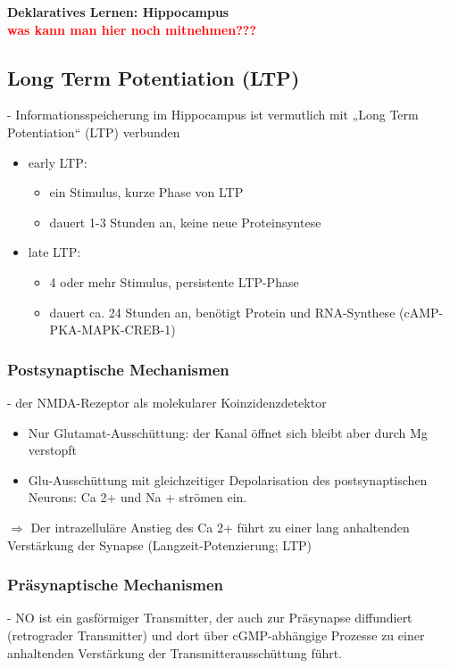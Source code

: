 \textbf{Deklaratives Lernen: Hippocampus}\\
\textcolor{red}{\textbf{was kann man hier noch mitnehmen???}}

\subsection{Long Term Potentiation (LTP)}
 - Informationsspeicherung im Hippocampus ist vermutlich mit „Long Term Potentiation“ (LTP) verbunden

\begin{itemize}
	\item early LTP:
	\begin{itemize}
		\item ein Stimulus, kurze Phase von LTP
		\item dauert 1-3 Stunden an, keine neue Proteinsyntese
	\end{itemize}
	\item late LTP:
	\begin{itemize}
		\item 4 oder mehr Stimulus, persistente LTP-Phase
		\item dauert ca. 24 Stunden an, benötigt Protein und RNA-Synthese (cAMP-PKA-MAPK-CREB-1)
	\end{itemize}
\end{itemize}

\subsubsection{Postsynaptische Mechanismen}
 - der NMDA-Rezeptor als molekularer Koinzidenzdetektor
\begin{itemize}
	\item Nur Glutamat-Ausschüttung: der Kanal öffnet sich bleibt aber durch Mg verstopft
	\item Glu-Ausschüttung mit gleichzeitiger Depolarisation des postsynaptischen Neurons: Ca 2+ und Na + strömen ein.
\end{itemize}

$\Rightarrow$ Der intrazelluläre Anstieg des Ca 2+ führt zu einer lang anhaltenden Verstärkung der Synapse (Langzeit-Potenzierung; LTP)

\subsubsection{Präsynaptische Mechanismen}
 - NO ist ein gasförmiger Transmitter, der auch zur Präsynapse diffundiert (retrograder Transmitter) und dort über cGMP-abhängige Prozesse zu einer anhaltenden Verstärkung der Transmitterausschüttung führt.


